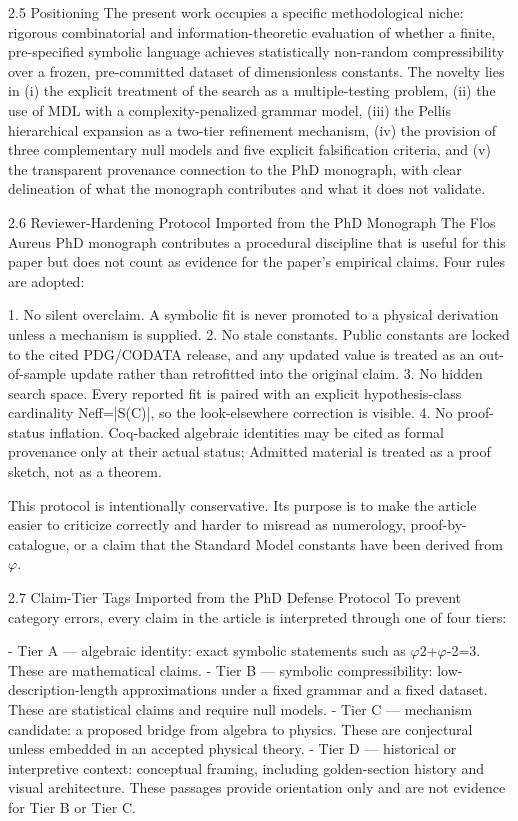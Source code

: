   2.5 Positioning
  The present work occupies a specific methodological niche: rigorous combinatorial and
  information-theoretic evaluation of whether a finite, pre-specified symbolic language
  achieves statistically non-random compressibility over a frozen, pre-committed dataset
  of dimensionless constants. The novelty lies in (i) the explicit treatment of the search as
  a multiple-testing problem, (ii) the use of MDL with a complexity-penalized grammar
  model, (iii) the Pellis hierarchical expansion as a two-tier refinement mechanism, (iv)
  the provision of three complementary null models and five explicit falsification criteria,
  and (v) the transparent provenance connection to the PhD monograph, with clear
  delineation of what the monograph contributes and what it does not validate.

  2.6 Reviewer-Hardening Protocol Imported from the PhD Monograph
  The Flos Aureus PhD monograph contributes a procedural discipline that is useful for
  this paper but does not count as evidence for the paper's empirical claims. Four rules
  are adopted:

  1. No silent overclaim. A symbolic fit is never promoted to a physical derivation unless a
  mechanism is supplied.
  2. No stale constants. Public constants are locked to the cited PDG/CODATA release,
  and any updated value is treated as an out-of-sample update rather than retrofitted into
  the original claim.
  3. No hidden search space. Every reported fit is paired with an explicit hypothesis-class
  cardinality Neff=|S(C)|, so the look-elsewhere correction is visible.
  4. No proof-status inflation. Coq-backed algebraic identities may be cited as formal
  provenance only at their actual status; Admitted material is treated as a proof sketch,
  not as a theorem.

  This protocol is intentionally conservative. Its purpose is to make the article easier to
  criticize correctly and harder to misread as numerology, proof-by-catalogue, or a claim
  that the Standard Model constants have been derived from $\varphi$.

  2.7 Claim-Tier Tags Imported from the PhD Defense Protocol
  To prevent category errors, every claim in the article is interpreted through one of four
  tiers:

  - Tier A --- algebraic identity: exact symbolic statements such as $\varphi$2+$\varphi$-2=3. These are
  mathematical claims.
  - Tier B --- symbolic compressibility: low-description-length approximations under a
  fixed grammar and a fixed dataset. These are statistical claims and require null models.
  - Tier C --- mechanism candidate: a proposed bridge from algebra to physics. These are
  conjectural unless embedded in an accepted physical theory.
  - Tier D --- historical or interpretive context: conceptual framing, including
  golden-section history and visual architecture. These passages provide orientation only
  and are not evidence for Tier B or Tier C.

